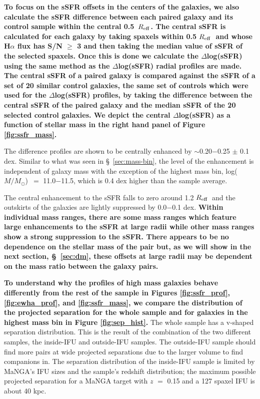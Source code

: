 \documentclass[iop,revtex4,twocolumn,apj,numberedappendix,appendixfloats]{emulateapj}
\newcommand{\reff}{$R_{\rm eff}$}
\newcommand{\logm}{log($M/M_{\odot}$)}
\begin{document}
\textbf{To focus on the sSFR offsets in the centers of the galaxies, we also calculate the sSFR difference between each paired galaxy and its control sample within the central 0.5~\reff. The central sSFR is calculated for each galaxy by taking spaxels within 0.5 \reff\ and whose H$\alpha$ flux has S/N $\ge$ 3 and then taking the median value of sSFR of the selected spaxels. Once this is done we calculate the $\Delta$log(sSFR) using the same method as the $\Delta$log(sSFR) radial profiles are made. The central sSFR of a paired galaxy is compared against the sSFR of a set of 20 similar control galaxies, the same set of controls which were used for the $\Delta$log(sSFR) profiles, by taking the difference between the central sSFR of the paired galaxy and the median sSFR of the 20 selected control galaxies. We depict the central $\Delta$log(sSFR) as a function of stellar mass in the right hand panel of Figure \ref{fig:ssfr_mass}.}

The difference profiles are shown to be centrally enhanced by $\sim$0.20$-$0.25 $\pm$ 0.1 dex. Similar to what was seen in \S~\ref{sec:mass-bin}, the level of the enhancement is independent of galaxy mass with the exception of the highest mass bin, \logm\ $=$ 11.0$-$11.5, which is 0.4 dex higher than the sample average. 

The central enhancement to the sSFR falls to zero around 1.2 \reff\ and the outskirts of the galaxies are lightly suppressed by 0.0$-$0.1 dex. \textbf{Within individual mass ranges, there are some mass ranges which feature large enhancements to the sSFR at large radii while other mass ranges show a strong suppression to the sSFR. There appears to be no dependence on the stellar mass of the pair but, as we will show in the next section, \S~\ref{sec:dm}, these offsets at large radii may be dependent on the mass ratio between the galaxy pairs.}

\textbf{To understand why the profiles of high mass galaxies behave differently from the rest of the sample in Figures \ref{fig:ssfr_prof}, \ref{fig:ewha_prof}, and \ref{fig:ssfr_mass}, we compare the distribution of the projected separation for the whole sample and for galaxies in the highest mass bin in Figure \ref{fig:sep_hist}.} The whole sample has a v-shaped separation distribution. This is the result of the combination of the two different samples, the inside-IFU and outside-IFU samples. The outside-IFU sample should find more pairs at wide projected separations due to the larger volume to find companions in. The separation distribution of the inside-IFU sample is limited by MaNGA's IFU sizes and the sample's redshift distribution; the maximum possible projected separation for a MaNGA target with $z$ $=$ 0.15 and a 127 spaxel IFU is about 40 kpc. 
\end{document}
